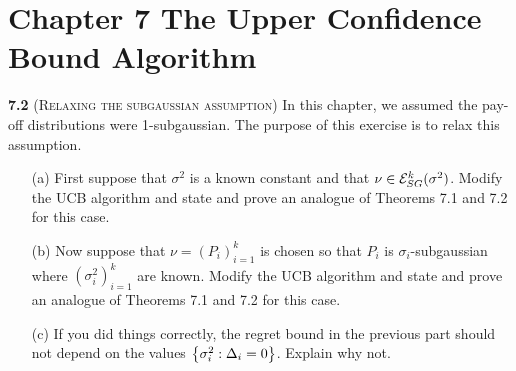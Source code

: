 \chapter*{Chapter 7 The Upper Confidence Bound Algorithm}
\label{sec:7}




\noindent\textbf{7.2} (\textsc{Relaxing the subgaussian assumption}) In this chapter, we assumed the pay-off distributions were 1-subgaussian. The purpose of this exercise is to relax this assumption. 
\begin{enumerate}
    \item[(a)] First suppose that $\sigma^2$ is a known constant and that $\nu \in \mathcal{E}_{SG}^k (\sigma^2)$. Modify the UCB algorithm and state and prove an analogue of Theorems 7.1 and 7.2 for this case.
    \item[(b)] Now suppose that $\nu =(P_i)_{i=1}^k $ is chosen so that $P_i$ is $\sigma_i$-subgaussian where $(\sigma_i^2)_{i=1}^k$ are known. Modify the UCB algorithm and state and prove an analogue of Theorems 7.1 and 7.2 for this case.
    \item[(c)] If you did things correctly, the regret bound in the previous part should not depend on the values $\left\{ \sigma_i^2:\Delta_i=0 \right\}$. Explain why not.
\end{enumerate}

